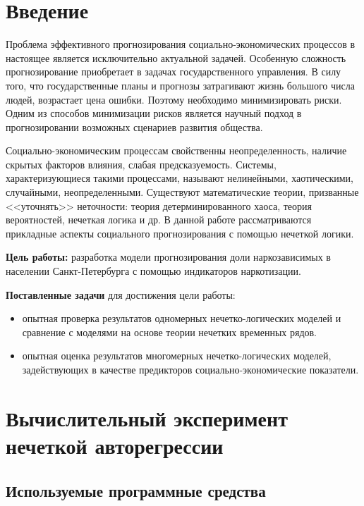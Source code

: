 \section*{Введение}

Проблема эффективного прогнозирования социально-экономических процессов в настоящее является исключительно актуальной задачей. Особенную сложность прогнозирование приобретает в задачах государственного управления. В силу того, что государственные планы и прогнозы затрагивают жизнь большого числа людей, возрастает цена ошибки. Поэтому необходимо минимизировать риски. Одним из способов минимизации рисков является научный подход в прогнозировании возможных сценариев развития общества.  

Социально-экономическим процессам свойственны неопределенность, наличие скрытых факторов влияния, слабая предсказуемость. Системы, характеризующиеся такими процессами, называют нелинейными, хаотическими, случайными, неопределенными. Существуют математические теории, призванные <<уточнять>> неточности: теория детерминированного хаоса, теория вероятностей, нечеткая логика и др. В данной работе рассматриваются прикладные аспекты социального прогнозирования с помощью нечеткой логики.

\textbf{Цель работы:} разработка модели прогнозирования доли наркозависимых в 
населении Санкт-Петербурга с помощью индикаторов наркотизации.%

\textbf{Поставленные задачи} для достижения цели работы:
\begin{itemize}
	\item опытная проверка результатов одномерных нечетко-логических моделей и сравнение с	моделями на основе теории нечетких временных рядов.
    \item опытная оценка результатов многомерных нечетко-логических моделей, 
        задействующих в качестве предикторов социально-экономические показатели.
\end{itemize} 



\section{Вычислительный эксперимент нечеткой авторегрессии}

\subsection{Используемые программные средства}

